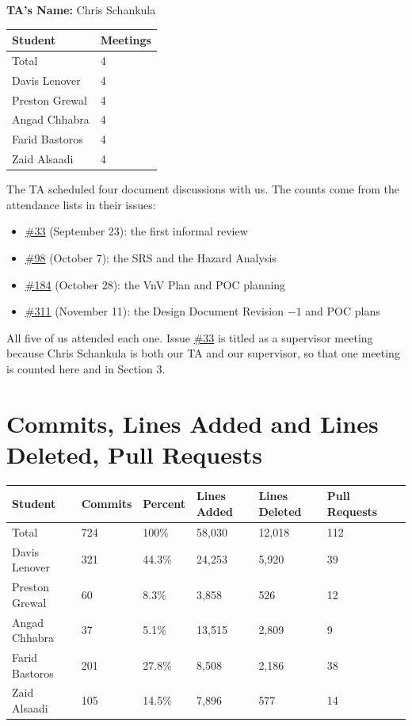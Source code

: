 \documentclass{article}
\begin{document}
\noindent \textbf{TA's Name: } Chris Schankula

\begin{table}[H]
\centering
\begin{tabular}{ll}
\toprule
\textbf{Student} & \textbf{Meetings}\\
\midrule
Total & 4\\
Davis Lenover & 4\\
Preston Grewal & 4\\
Angad Chhabra & 4\\
Farid Bastoros & 4\\
Zaid Alsaadi & 4\\
\bottomrule
\end{tabular}
\end{table}

The TA scheduled four document discussions with us. The counts come from the
attendance lists in their issues:

\begin{itemize}
\item \href{https://github.com/davislenover/BurnNEarn/issues/33}{\#33} (September 23): the first informal review
\item \href{https://github.com/davislenover/BurnNEarn/issues/98}{\#98} (October 7): the SRS and the Hazard Analysis
\item \href{https://github.com/davislenover/BurnNEarn/issues/184}{\#184} (October 28): the VnV Plan and POC planning
\item \href{https://github.com/davislenover/BurnNEarn/issues/311}{\#311} (November 11): the Design Document Revision $-1$ and POC plans
\end{itemize}

All five of us attended each one. Issue \href{https://github.com/davislenover/BurnNEarn/issues/33}{\#33} is titled as a supervisor
meeting because Chris Schankula is both our TA and our supervisor, so that one
meeting is counted here and in Section 3.

\section{Commits, Lines Added and Lines Deleted, Pull Requests}

\begin{table}[H]
\centering
\begin{tabular}{lllllll}
\toprule
\textbf{Student} & \textbf{Commits} & \textbf{Percent} & \textbf{Lines Added} &
\textbf{Lines Deleted} & \textbf{Pull Requests}\\
\midrule
Total & 724 & 100\% & 58,030 & 12,018 & 112\\
Davis Lenover & 321 & 44.3\% & 24,253 & 5,920 & 39\\
Preston Grewal & 60 & 8.3\% & 3,858 & 526 & 12\\
Angad Chhabra & 37 & 5.1\% & 13,515 & 2,809 & 9\\
Farid Bastoros & 201 & 27.8\% & 8,508 & 2,186 & 38\\
Zaid Alsaadi & 105 & 14.5\% & 7,896 & 577 & 14\\
\bottomrule
\end{tabular}
\end{table}
\end{document}
